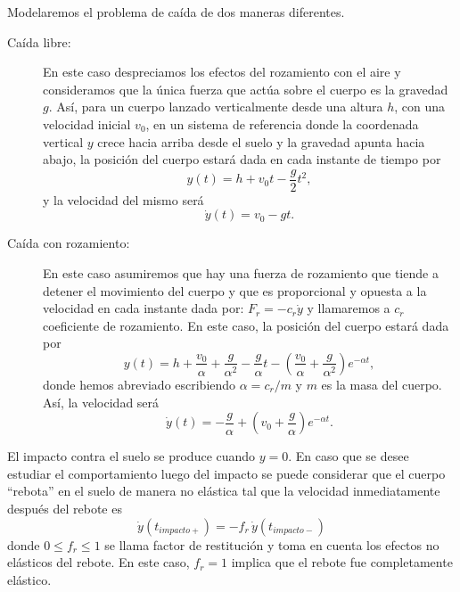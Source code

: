 \documentclass[a4paper]{article}
\begin{document}
Modelaremos el problema de caída de dos maneras diferentes. 
\begin{description}
 \item[Caída libre:] En este caso despreciamos los efectos del rozamiento con el aire y consideramos que la única fuerza que actúa sobre el cuerpo es la gravedad $g$. Así, para un cuerpo lanzado verticalmente desde una altura $h$, con una velocidad inicial $v_0$, en un sistema de referencia donde la coordenada vertical $y$ crece hacia arriba desde el suelo y la gravedad apunta hacia abajo, la posición del cuerpo estará dada en cada instante de tiempo por
\begin{equation}
 y(t) = h + v_0 t - \frac{g}{2} t^2,
\end{equation}
y la velocidad del mismo será
\begin{equation}
 \dot{y}(t) = v_0 - g t.
\end{equation}
 \item[Caída con rozamiento: ] En este caso asumiremos que hay una fuerza de rozamiento que tiende a detener el movimiento del cuerpo y que es proporcional y opuesta a la velocidad en cada instante dada por: $F_r = - c_r \dot{y}$ y llamaremos a $c_r$ coeficiente de rozamiento. En este caso, la posición del cuerpo estará dada por
\begin{equation}
 y(t) = h + \frac{v_0}{\alpha} + \frac{g}{\alpha^2} - \frac{g}{\alpha} t -\left( \frac{v_0}{\alpha} + \frac{g}{\alpha^2} \right) e^{-\alpha t},
\end{equation}
donde hemos abreviado escribiendo $\alpha = c_r / m$ y $m$ es la masa del cuerpo. Así, la velocidad será 
\begin{equation}
 \dot{y}(t) = - \frac{g}{\alpha} +\left( v_0 + \frac{g}{\alpha} \right) e^{-\alpha t}.
\end{equation}
\end{description}

El impacto contra el suelo se produce cuando $y=0$. En caso que se desee estudiar el comportamiento luego del impacto se puede considerar que el cuerpo ``rebota'' en el suelo de manera no elástica tal que la velocidad inmediatamente después del rebote es 
\begin{equation}
\dot{y}(t_{impacto+}) = - f_r \, \dot{y}(t_{impacto-})
\end{equation}
donde $0 \leq f_r \leq 1$ se llama factor de restitución y toma en cuenta los efectos no elásticos del rebote. En este caso, $f_r = 1$ implica que el rebote fue completamente elástico.
\end{document}
